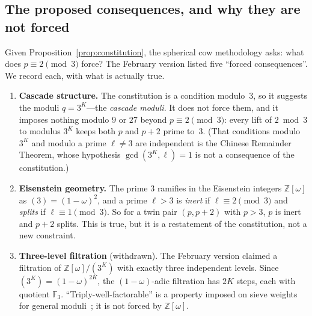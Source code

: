 \documentclass[12pt]{amsart}
\theoremstyle{plain}
\theoremstyle{definition}
\theoremstyle{remark}
\begin{document}
\subsection{The proposed consequences, and why they are not forced}
\label{sec:forced}

Given Proposition~\ref{prop:constitution}, the spherical cow methodology asks:
what does $p \equiv 2 \pmod{3}$ force? The February version listed five
``forced consequences''. We record each, with what is actually true.

\begin{enumerate}[label=(\arabic*)]
  \item \textbf{Cascade structure.} The constitution is a condition
    modulo~$3$, so it suggests the moduli $q = 3^K$---the \emph{cascade
    moduli}. It does not force them, and it imposes nothing modulo $9$ or $27$
    beyond $p \equiv 2 \pmod 3$: every lift of $2 \bmod 3$ to modulus $3^K$
    keeps both $p$ and $p + 2$ prime to~$3$. (That conditions modulo $3^K$ and
    modulo a prime $\ell \neq 3$ are independent is the Chinese Remainder
    Theorem, whose hypothesis $\gcd(3^K, \ell) = 1$ is not a consequence of the
    constitution.)

  \item \textbf{Eisenstein geometry.} The prime $3$ ramifies in the Eisenstein
    integers $\mathbb{Z}[\omega]$ as $(3) = (1-\omega)^2$, and a prime
    $\ell > 3$ is \emph{inert} if $\ell \equiv 2 \pmod{3}$ and \emph{splits} if
    $\ell \equiv 1 \pmod{3}$. So for a twin pair $(p, p+2)$ with $p > 3$, $p$ is
    inert and $p + 2$ splits. This is true, but it is a restatement of the
    constitution, not a new constraint.

  \item \textbf{Three-level filtration} (withdrawn). The February version
    claimed a filtration of $\mathbb{Z}[\omega]/(3^K)$ with exactly three
    independent levels. Since $(3^K) = (1-\omega)^{2K}$, the
    $(1-\omega)$-adic filtration has $2K$ steps, each with quotient
    $\mathbb{F}_3$. ``Triply-well-factorable'' is a property imposed on sieve
    weights for general moduli~\cite{Lichtman2023,Pascadi2025}; it is not
    forced by $\mathbb{Z}[\omega]$.


\end{enumerate}
\end{document}
